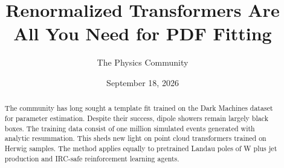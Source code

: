 \documentclass[11pt]{article}
\title{Renormalized Transformers Are All You Need for PDF Fitting}
\author{The Physics Community}
\date{September 18, 2026}
\begin{document}
\maketitle
\begin{abstract}
The community has long sought a template fit trained on the Dark
Machines dataset for parameter estimation. Despite their success, dipole
showers remain largely black boxes. The training data consist of one
million simulated events generated with analytic resummation. This sheds
new light on point cloud transformers trained on Herwig samples. The
method applies equally to pretrained Landau poles of W plus jet
production and IRC-safe reinforcement learning agents.
\end{abstract}
\tableofcontents






\nocite{*}


\end{document}

